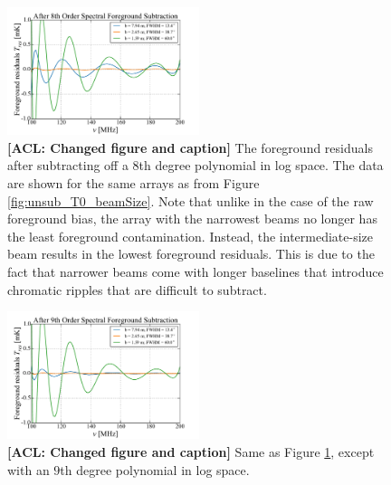 \documentclass[twocolumn,apj,numberedappendix]{emulateapj}
\newcommand{\acl}[1]{{\color{red} \textbf{[ACL:  #1]}}}
\begin{document}
\begin{figure}[h]
	\centering
	\includegraphics[width=0.50\textwidth]{figures/subPoly8_T0_beamSize.pdf}
	\caption{\acl{Changed figure and caption} The foreground residuals after subtracting off a $8$th degree polynomial in log space. The data are shown for the same arrays as from Figure \ref{fig:unsub_T0_beamSize}. Note that unlike in the case of the raw foreground bias, the array with the narrowest beams no longer has the least foreground contamination. Instead, the intermediate-size beam results in the lowest foreground residuals. This is due to the fact that narrower beams come with longer baselines that introduce chromatic ripples that are difficult to subtract.}
	\label{fig:subPoly8_T0_beamSize}
\end{figure}

\begin{figure}[h]
	\centering
	\includegraphics[width=0.50\textwidth]{figures/subPoly9_T0_beamSize.pdf}
	\caption{\acl{Changed figure and caption} Same as Figure \ref{fig:subPoly8_T0_beamSize}, except with an $9$th degree polynomial in log space.}
	\label{fig:subPoly9_T0_beamSize}
\end{figure}

\end{document}
